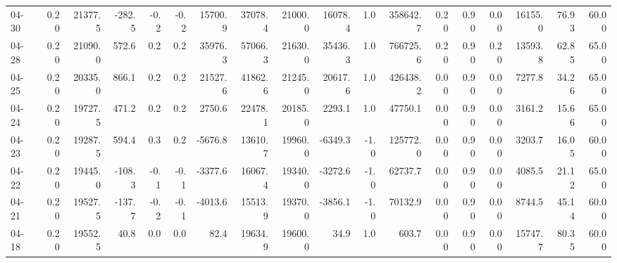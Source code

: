 \begin{threeparttable}
{\begin{tabular}{lrrrrrrrrrrrrrrrrr}
  04-30 &     0.20 & 21377.5 &            -282.5 &              -0.2 &               -0.2 &            15700.9 & 37078.4 & 21000.0 &    16078.4 &                      1.0 &            358642.7 &       0.20 &      0.90 &           0.00 &          16155.0 &           76.93 &                  60.00 \\
  04-28 &     0.20 & 21090.0 &             572.6 &               0.2 &                0.2 &            35976.3 & 57066.3 & 21630.0 &    35436.3 &                      1.0 &            766725.6 &       0.20 &      0.90 &           0.20 &          13593.8 &           62.85 &                  65.00 \\
  04-25 &     0.20 & 20335.0 &             866.1 &               0.2 &                0.2 &            21527.6 & 41862.6 & 21245.0 &    20617.6 &                      1.0 &            426438.2 &       0.00 &      0.90 &           0.00 &           7277.8 &           34.26 &                  65.00 \\
  04-24 &     0.20 & 19727.5 &             471.2 &               0.2 &                0.2 &             2750.6 & 22478.1 & 20185.0 &     2293.1 &                      1.0 &             47750.1 &       0.00 &      0.90 &           0.00 &           3161.2 &           15.66 &                  65.00 \\
  04-23 &     0.20 & 19287.5 &             594.4 &               0.3 &                0.2 &            -5676.8 & 13610.7 & 19960.0 &    -6349.3 &                     -1.0 &            125772.0 &       0.00 &      0.90 &           0.00 &           3203.7 &           16.05 &                  60.00 \\
  04-22 &     0.20 & 19445.0 &            -108.3 &              -0.1 &               -0.1 &            -3377.6 & 16067.4 & 19340.0 &    -3272.6 &                     -1.0 &             62737.7 &       0.00 &      0.90 &           0.00 &           4085.5 &           21.12 &                  65.00 \\
  04-21 &     0.20 & 19527.5 &            -137.7 &              -0.2 &               -0.1 &            -4013.6 & 15513.9 & 19370.0 &    -3856.1 &                     -1.0 &             70132.9 &       0.00 &      0.90 &           0.00 &           8744.5 &           45.14 &                  60.00 \\
  04-18 &     0.20 & 19552.5 &              40.8 &               0.0 &                0.0 &               82.4 & 19634.9 & 19600.0 &       34.9 &                      1.0 &               603.7 &       0.00 &      0.90 &           0.00 &          15747.7 &           80.35 &                  60.00 \\

\end{tabular}}
\end{threeparttable}
